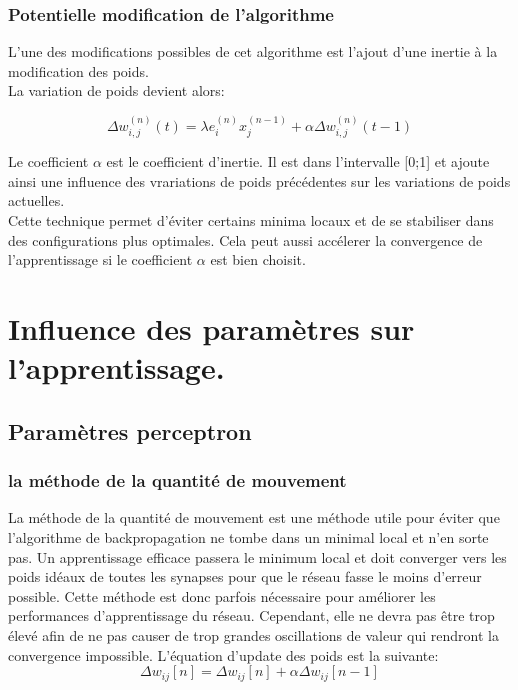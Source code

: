 \documentclass[a4paper,twoside]{report}
\begin{document}
                \subsection{Potentielle modification de l'algorithme}

                    L'une des modifications possibles de cet algorithme est l'ajout d'une inertie à la modification des poids.\\

                    La variation de poids devient alors:

                    \begin{equation}
                        \Delta w_{i,j}^{(n)}(t) = \lambda e_{i}^{(n)}x_{j}^{(n-1)} + \alpha \Delta w_{i,j}^{(n)}(t-1)
                    \end{equation}

                    Le coefficient $\alpha$ est le coefficient d'inertie. Il est dans l'intervalle [0;1] et ajoute ainsi une influence des vrariations de poids précédentes sur les variations de poids actuelles.\\

                    Cette technique permet d'éviter certains minima locaux et de se stabiliser dans des configurations plus optimales. Cela peut aussi accélerer la convergence de l'apprentissage si le coefficient $\alpha$ est bien choisit.


        \chapter{Influence des paramètres sur l'apprentissage.}


\section{Paramètres perceptron}

\subsection{la méthode de la quantité de mouvement}
La méthode de la quantité de mouvement est une méthode utile pour éviter que l'algorithme de backpropagation ne tombe dans un minimal local et n'en sorte pas. Un apprentissage efficace passera le minimum local et doit converger vers les poids idéaux de toutes les synapses pour que le réseau fasse le moins d'erreur possible. Cette méthode est donc parfois nécessaire pour améliorer les performances d'apprentissage du réseau. Cependant, elle ne devra pas être trop élevé afin de ne pas causer de trop grandes oscillations de valeur qui rendront la convergence impossible.
L'équation d'update des poids est la suivante:
\begin{equation}
\Delta w_{ij}[n]= \Delta w_{ij}[n]+ \alpha \Delta w_{ij}[n-1]
\end{equation}
\end{document}
